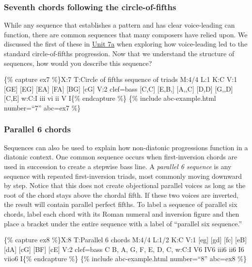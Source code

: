 \documentclass{book}
\begin{document}
\hypertarget{seventh-chords-following-the-circle-of-fifths}{%
\subsubsection{Seventh chords following the
circle-of-fifths}\label{seventh-chords-following-the-circle-of-fifths}}

While any sequence that establishes a pattern and has clear voice-leading can
function, there are common sequences that many composers have relied upon. We
discussed the first of these in
\href{07-harmonic-functions/a1-diaprogcirclefifths.html}{Unit 7a} when
exploring how voice-leading led to the standard circle-of-fifths progression.
Now that we understand the structure of sequences, how would you describe this
sequence?

\{\% capture ex7 \%\}X:7 T:Circle of fifths sequence of triads M:4/4 L:1 K:C
V:1 {[}GE{]}\textbar{} {[}EG{]}\textbar{} {[}EA{]}\textbar{}
{[}FA{]}\textbar{} {[}BG{]}\textbar{} {[}cG{]}\textbar{]} V:2 clef=bass
{[}C,C{]}\textbar{} {[}E,B,{]}\textbar{} {[}A,,C{]}\textbar{}
{[}D,D{]}\textbar{} {[}G,,D{]}\textbar{} {[}C,E{]}\textbar{]} w:C:I iii vi ii
V I\{\% endcapture \%\} \{\% include abc-example.html number=``7'' abc=ex7
\%\}

\hypertarget{parallel-6-chords}{%
\subsubsection{Parallel 6 chords}\label{parallel-6-chords}}

Sequences can also be used to explain how non-diatonic progressions function
in a diatonic context. One common sequence occurs when first-inversion chords
are used in succession to create a stepwise bass line. A \emph{parallel 6
sequence} is any sequence with repeated first-inversion triads, most commonly
moving downward by step. Notice that this does not create objectional parallel
voices as long as the root of the chord stays above the chordal fifth. If
these two voices are inverted, the result will contain parallel perfect
fifths. To label a sequence of parallel six chords, label each chord with its
Roman numeral and inversion figure and then place a bracket under the entire
sequence with a label of ``parallel six sequence.''

\{\% capture ex8 \%\}X:8 T:Parallel 6 chords M:4/4 L:1/2 K:C V:1 {[}eg{]}
{[}gd{]}\textbar{} {[}fc{]} {[}eB{]}\textbar{} {[}dA{]} {[}cG{]}\textbar{}
{[}BF{]} {[}cE{]}\textbar{]} V:2 clef=bass C B,\textbar{} A, G,\textbar{} F,
E,\textbar{} D, C,\textbar{]} w:C:I V6 IV6 iii6 ii6 I6 viio6 I\{\% endcapture
\%\} \{\% include abc-example.html number=``8'' abc=ex8 \%\}
\end{document}
